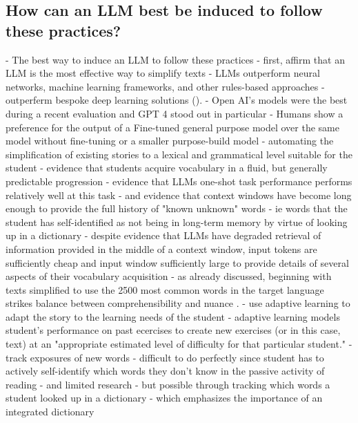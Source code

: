 \documentclass[
	letterpaper, %
]{jdf}
\begin{document}
\subsection{How can an LLM best be induced to follow these practices?}
      
- The best way to induce an LLM to follow these practices
  - first, affirm that an LLM is the most effective way to simplify texts
    - LLMs outperform neural networks, machine learning frameworks, and other rules-based approaches
      - outperferm bespoke deep learning solutions (\cite{feng2023sentence}).
    - Open AI's models were the best during a recent evaluation \cite{kew2023bless} and GPT 4 stood out in particular \cite{wu2024indepth}
    - Humans show a preference for the output of a Fine-tuned general purpose model over the same model without fine-tuning or a smaller purpose-build model \cite{ai_human_taking_turns_creating_story}
  - automating the simplification of existing stories to a lexical and grammatical level suitable for the student
    - evidence that students acquire vocabulary in a fluid, but generally predictable progression
    - evidence that LLMs one-shot task performance performs relatively well at this task
      - and evidence that context windows have become long enough to provide the full history of "known unknown" words
        - ie words that the student has self-identified as not being in long-term memory by virtue of looking up in a dictionary
        - despite evidence that LLMs have degraded retrieval of information provided in the middle of a context window, input tokens are sufficiently cheap and input window sufficiently large to provide details of several aspects of their vocabulary acquisition \cite{liu2023lost}
    - as already discussed, beginning with texts simplified to use the 2500 most common words in the target language strikes balance between comprehensibility and nuance \cite{nation1992vocabulary}.
  - use adaptive learning to adapt the story to the learning needs of the student 
    - adaptive learning models student's performance on past ecercises to create new exercises (or in this case, text) at an "appropriate estimated level of difficulty for that particular student." \cite{important_adaptive_learning_exercise_generation}
    - track exposures of new words 
      - difficult to do perfectly since student has to actively self-identify which words they don't know in the passive activity of reading
        - and limited research
        - but possible through tracking which words a student looked up in a dictionary
          - which emphasizes the importance of an integrated dictionary
\end{document}
